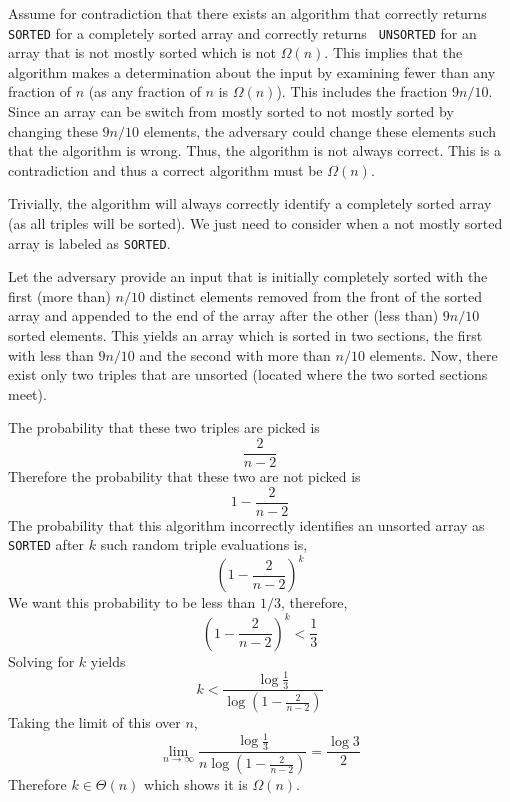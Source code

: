 \documentclass[12pt,twoside]{article}
\begin{document}
\begin{problems}

\problem  %

\begin{problemparts}

\problempart %

Assume for contradiction that there exists an algorithm that correctly
returns {\tt SORTED} for a completely sorted array and correctly returns {\tt
UNSORTED} for an array that is not mostly sorted which is not $\Omega(n)$.
This implies that the algorithm makes a determination about the input by
examining fewer than any fraction of $n$ (as any fraction of $n$ is
$\Omega(n)$). This includes the fraction $9n/10$. Since an array can be
switch from mostly sorted to not mostly sorted by changing these $9n/10$
elements, the adversary could change these elements such that the algorithm
is wrong. Thus, the algorithm is not always correct. This is a contradiction
and thus a correct algorithm must be $\Omega(n)$.

\problempart %

Trivially, the algorithm will always correctly identify a completely sorted
array (as all triples will be sorted). We just need to consider when a not
mostly sorted array is labeled as {\tt SORTED}.

Let the adversary provide an input that is initially completely sorted with
the first (more than) $n/10$ distinct elements removed from the front of the
sorted array and appended to the end of the array after the other (less than)
$9n/10$ sorted elements. This yields an array which is sorted in two
sections, the first with less than $9n/10$ and the second with more than
$n/10$ elements. Now, there exist only two triples that are unsorted (located
where the two sorted sections meet).

The probability that these two triples are picked is
$$ \frac{2}{n - 2} $$
Therefore the probability that these two are not picked is
$$ 1 - \frac{2}{n - 2} $$
The probability that this algorithm incorrectly identifies an unsorted array
as {\tt SORTED} after $k$ such random triple evaluations is,
$$ \left(1 - \frac{2}{n - 2}\right)^k $$
We want this probability to be less than $1/3$, therefore,
$$ \left(1 - \frac{2}{n - 2}\right)^k < \frac{1}{3} $$
Solving for $k$ yields
$$ k < \frac{\log \frac{1}{3}}{\log\left(1 - \frac{2}{n - 2}\right)} $$
Taking the limit of this over $n$,
$$ \lim_{n \to \infty} \frac{\log \frac{1}{3}}{n \log\left(1 - \frac{2}{n -
2}\right)} = \frac{\log 3}{2} $$
Therefore $k \in \Theta(n)$ which shows it is $\Omega(n)$.


\end{problemparts}
\end{problems}
\end{document}
